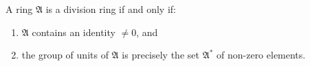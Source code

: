 A ring $\mathfrak{A}$ is a division ring if and only if:
\begin{enumerate}
\item $\mathfrak{A}$ contains an identity $\neq 0$, and
\item the group of units of $\mathfrak{A}$ is precisely the set $\mathfrak{A}^*$ of non-zero elements.
\end{enumerate}
